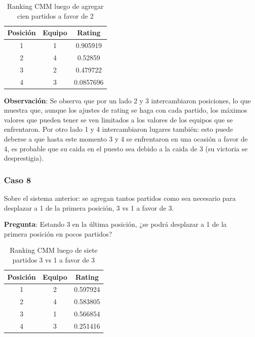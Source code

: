 \begin{table}[h!]
    \begin{center}
        \begin{tabular}{|c|c|c|}
        \hline
        \textbf{Posición} & \textbf{Equipo} & \textbf{Rating} \\
        \hline
        1 & 1 & 0.905919\\
        2 & 4 & 0.52859\\
        3 & 2 & 0.479722\\
        4 & 3 & 0.0857696\\
        \hline
        \end{tabular}
        \caption{Ranking CMM luego de agregar cien partidos a favor de 2}
        \label{cmm_caso_7}
    \end{center}
\end{table}

\textbf{Observación}: Se observa que por un lado 2 y 3 intercambiaron posiciones, lo que muestra que, aunque los ajustes de rating se haga con cada partido, los máximos valores que pueden tener se ven limitados a los valores de los equipos que se enfrentaron. Por otro lado 1 y 4 intercambiaron lugares también: esto puede deberse a que hasta este momento 3 y 4 se enfrentaron en una ocasión a favor de 4, es probable que su caida en el puesto sea debido a la caida de 3 (su victoria se desprestigia).

\subsubsection*{Caso 8}

Sobre el sistema anterior: se agregan tantos partidos como sea necesario para desplazar a 1 de la primera posición, 3 vs 1 a favor de 3.

\textbf{Pregunta}: Estando 3 en la última posición, ¿se podrá desplazar a 1 de la primera posición en pocos partidos?

\begin{table}[h!]
    \begin{center}
        \begin{tabular}{|c|c|c|}
        \hline
        \textbf{Posición} & \textbf{Equipo} & \textbf{Rating} \\
        \hline
        1 & 2 & 0.597924\\
        2 & 4 & 0.583805\\
        3 & 1 & 0.566854\\
        4 & 3 & 0.251416\\
        \hline
        \end{tabular}
        \caption{Ranking CMM luego de siete partidos 3 vs 1 a favor de 3}
        \label{cmm_caso_8}
    \end{center}
\end{table}

